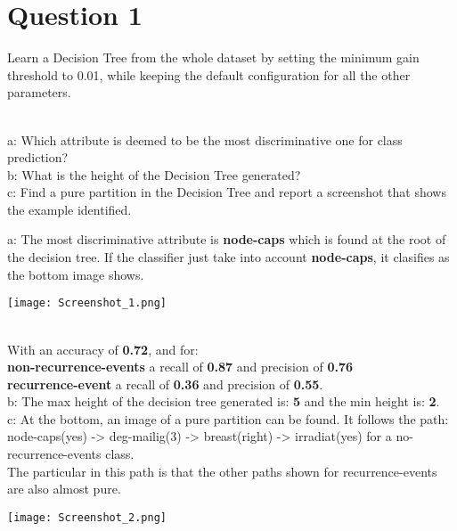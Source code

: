 \section{Question 1}

\begin{question}
     Learn a Decision Tree from the whole dataset by setting the minimum gain threshold to 0.01, while
keeping the default configuration for all the other parameters.

     \\
     a: Which attribute is deemed to be the most discriminative one for class prediction?
     \\
     b: What is the height of the Decision Tree generated?
     \\
     c: Find a pure partition in the Decision Tree and report a screenshot that shows the
    example identified.
\end{question}
\begin{anwer}
     a: The most discriminative attribute is \textbf{node-caps} which is found at the root of the
     decision tree. If the classifier just take into account \textbf{node-caps}, it clasifies as the bottom image shows.

     \begin{center}
          \texttt{[image: Screenshot\_1.png]}
    \end{center}
     \\
     With an accuracy of \textbf{0.72}, and for:
     \\
     \textbf{non-recurrence-events} a recall of \textbf{0.87} and precision of \textbf{0.76}
     \\
     \textbf{recurrence-event} a recall of \textbf{0.36} and precision of \textbf{0.55}.
     \\
     \linebreak
     b: The max height of the decision tree generated is: \textbf{5} and the min height is: \textbf{2}.
     \\
     \linebreak
     c: At the bottom, an image of a pure partition can be found. It follows the path:
     \\
     node-caps(yes) -> deg-mailig(3) -> breast(right) -> irradiat(yes) for a no-recurrence-events class.
     \\
     The particular in this path is that the other
     paths shown for recurrence-events are also almost pure.
     \\
     \begin{center}
          \texttt{[image: Screenshot\_2.png]}
     \end{center}
\end{anwer}
\pagebreak